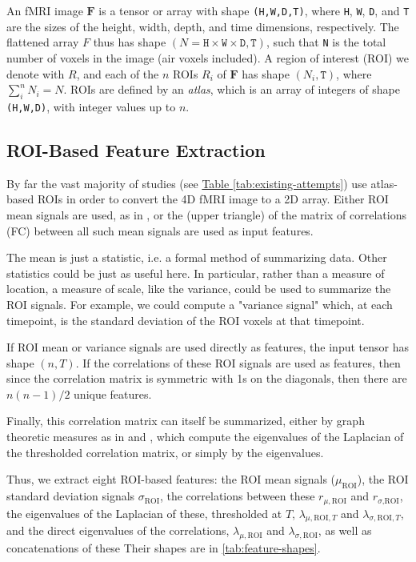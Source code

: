 \documentclass[10pt]{article}
\begin{document}
An fMRI image \(\bm{F}\) is a tensor or array with shape \texttt{(H,W,D,T)}, where \texttt{H},
\texttt{W}, \texttt{D}, and \texttt{T} are the sizes of the height, width, depth, and time
dimensions, respectively. The flattened array \(F\) thus has shape \((N = \texttt{H} \times
\texttt{W} \times \texttt{D}, \texttt{T})\), such that \texttt{N} is the total number of voxels in
the image (air voxels included). A region of interest (ROI) we denote with \(R\), and each of the
\(n\) ROIs \(R_i\) of \(\bm{F}\) has shape \((N_i, \texttt{T})\), where \(\sum_i^n N_i= N\). ROIs
are defined by an \emph{atlas}, which is an array of integers of shape \texttt{(H,W,D)}, with
integer values up to \(n\).

\subsection{ROI-Based Feature Extraction}

By far the vast majority of studies (see \hyperref[tab:existing-attempts]{Table
\ref{tab:existing-attempts}}) use atlas-based ROIs in order to convert the 4D fMRI image to a 2D
array. Either ROI mean signals are used, as in \citet{el-gazzarHybrid3DCNN3DCLSTM2019}, or the
(upper triangle) of the matrix of correlations (FC) between all such mean signals are used as input
features.

The mean is just a statistic, i.e. a formal method of summarizing data. Other statistics could be
just as useful here. In particular, rather than a measure of location, a measure of scale, like the
variance, could be used to summarize the ROI signals. For example, we could compute a "variance
signal" which, at each timepoint, is the standard deviation of the ROI voxels at that timepoint.

If ROI mean or variance signals are used directly as features, the input tensor has shape \((n,
T)\). If the correlations of these ROI signals are used as features, then since the correlation
matrix is symmetric with 1s on the diagonals, then there are \(n(n-1)/2\) unique features.

Finally, this correlation matrix can itself be summarized, either by graph theoretic measures as in
\citet{yinDiagnosisAutismSpectrum2021} and \citet{mostafaDiagnosisAutismSpectrum2019}, which compute
the eigenvalues of the Laplacian of the thresholded correlation matrix, or simply by the
eigenvalues.

Thus, we extract eight ROI-based features: the ROI mean signals (\(\mu_{\text{ROI}}\)), the ROI
standard deviation signals \(\sigma_{\text{ROI}}\), the correlations between these
\(r_{\mu,\text{ROI}}\) and \(r_{\sigma\text{,ROI}}\), the eigenvalues of the Laplacian of these,
thresholded at \(T\), \(\lambda_{\mu,\text{ROI},T}\) and \(\lambda_{\sigma,\text{ROI},T}\), and the
direct eigenvalues of the correlations, \(\lambda_{\mu,\text{ROI}}\) and
\(\lambda_{\sigma,\text{ROI}}\), as well as concatenations of these  Their shapes are in \ref{tab:feature-shapes}.
\end{document}
